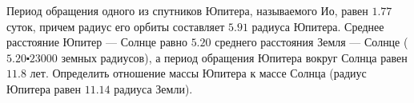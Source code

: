Период обращения одного из спутников Юпитера, называемого Ио, равен $1.77$ суток, причем радиус его орбиты составляет 
$5.91$ радиуса Юпитера. Среднее расстояние Юпитер --- Солнце равно $5.20$ среднего расстояния Земля ---  Солнце ($5.20\centerdot 23 000$ земных радиусов), а период обращения Юпитера вокруг Солнца равен $11.8$ лет. Определить 
отношение массы Юпитера к массе Солнца (радиус Юпитера равен $11.14$ радиуса Земли).
